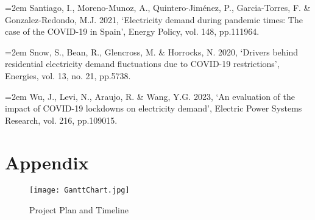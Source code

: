 \documentclass[mstat,12pt]{unswthesis}
\begin{document}
\hangindent=2em
\noindent Santiago, I., Moreno-Munoz, A., Quintero-Jiménez, P., Garcia-Torres, F. \& Gonzalez-Redondo, M.J. 2021, ‘Electricity demand during pandemic times: The case of the COVID-19 in Spain’, Energy Policy, vol. 148, pp.111964. \hfill\break

\hangindent=2em
\noindent Snow, S., Bean, R., Glencross, M. \& Horrocks, N. 2020, ‘Drivers behind residential electricity demand fluctuations due to COVID-19 restrictions’, Energies, vol. 13, no. 21, pp.5738. \hfill\break

\hangindent=2em
\noindent Wu, J., Levi, N., Araujo, R. \& Wang, Y.G. 2023, ‘An evaluation of the impact of COVID-19 lockdowns on electricity demand’, Electric Power Systems Research, vol. 216, pp.109015. \hfill\break

\bigskip

\hypertarget{appendix}{%
\chapter*{Appendix}\label{appendix}}

	\begin{figure}[htbp]%
		\centering
		
		\texttt{[image: GanttChart.jpg]} 
		\caption{Project Plan and Timeline}
	\end{figure}%
\end{document}
